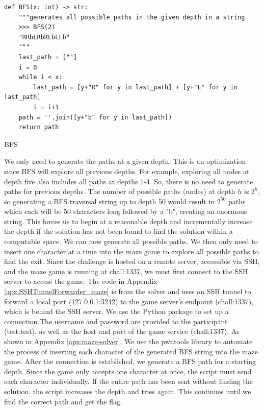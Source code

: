 \begin{listing}[H]
  \begin{verbatim}
def BFS(x: int) -> str:
    """generates all possible paths in the given depth in a string 
    >>> BFS(2)
    "RRbLRbRLbLLb"
    """
    last_path = [""]
    i = 0
    while i < x:
        last_path = [y+"R" for y in last_path] + [y+"L" for y in last_path]
        i = i+1
    path = ''.join([y+"b" for y in last_path])
    return path
\end{verbatim}
  \vspace{-1.5\baselineskip} %
 \caption{BFS}
\label{fig:create-account1}
\end{listing}
\noindent
We only need to generate the paths at a given depth. This is an optimization since BFS will explore all previous depths. For example, exploring all nodes at depth five also includes all paths at depths 1-4. So, there is no need to generate paths for previous depths. The number of possible paths (nodes) at depth $h$ is \(2^h\), so generating a BFS traversal string up to depth 50 would result in  \(2^{50}\) paths which each will be 50 characters long followed by a "b", creating an enormous string. This forces us to begin at a reasonable depth and incrementally increase the depth if the solution has not been found to find the solution within a computable space. We can now generate all possible paths. We then only need to insert one character at a time into the maze game to explore all possible paths to find the exit. Since the challenge is hosted on a remote server, accessible via SSH, and the maze game is running at chall:1337, we must first connect to the SSH server to access the game. The code in Appendix \ref{apx:SSHTunnelForwarder_maze} is from the solver and uses an SSH tunnel to forward a local port (127.0.0.1:3242) to the game server's endpoint (chall:1337), which is behind the SSH server. We use the \cite{sshtunnel} Python package to set up a connection The username and password are provided to the participant (test:test), as well as the host and port of the game service (chall:1337). As shown in Appendix \ref{apx:maze-solver}. We use the pwntools library to automate the process of inserting each character of the generated BFS string into the maze game.
After the connection is established, we generate a BFS path for a starting depth.
Since the game only accepts one character at once, the script must send each character individually. If the entire path has been sent without finding the solution, the script increases the depth and tries again. This continues until we find the correct path and get the flag.


